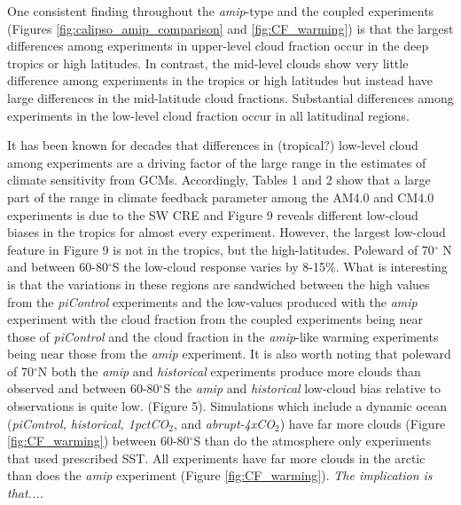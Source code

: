 \documentclass[draft]{agujournal2019}
\begin{document}
One consistent finding throughout the \textit{amip}-type and the coupled experiments (Figures \ref{fig:calipso_amip_comparison} 
and \ref{fig:CF_warming}) is that the largest differences among experiments
in upper-level cloud fraction occur in the deep tropics or high latitudes.  In contrast, the mid-level clouds show very little 
difference among experiments in the tropics or high latitudes but instead have large differences in the mid-latitude 
cloud fractions.  Substantial differences among experiments in the low-level cloud fraction occur in all latitudinal regions.    

It has been known for decades that differences in (tropical?) low-level cloud among experiments are a driving factor of the large range in the estimates of climate 
sensitivity from GCMs.  Accordingly, Tables 1 and 2 show that a large part of the range in climate feedback parameter among the AM4.0 and CM4.0 
experiments is due to the SW 
CRE and Figure 9 reveals different low-cloud biases in the tropics for almost every experiment.   
However, the largest low-cloud feature in Figure 9 is not in the tropics, but the high-latitudes.  Poleward of 70$^\circ$ N and between 
60-80$^\circ$S the low-cloud response varies by 8-15\%.  What is 
interesting is that the variations in these regions are sandwiched between the high values from the \textit{piControl} experiments and the low-values
produced with the \textit{amip} experiment with the cloud fraction from the coupled experiments being near those of \textit{piControl} and the
cloud fraction in the \textit{amip}-like warming experiments being near those from the \textit{amip} experiment.  
It is also worth noting that poleward of 70$^\circ$N both the \textit{amip} and \textit{historical} experiments produce more clouds than 
observed and between 60-80$^\circ$S the \textit{amip} and \textit{historical} low-cloud bias relative to observations is quite low. (Figure 5). 
Simulations which include a dynamic ocean (\textit{piControl, historical, 1pctCO$_2$}, and \textit{abrupt-4xCO$_2$}) have far more clouds (Figure \ref{fig:CF_warming})
between  60-80$^\circ$S than do the atmosphere only experiments that used prescribed
SST.  All experiments have far more clouds in the arctic than does the \textit{amip} experiment (Figure \ref{fig:CF_warming}).  
\textit{The implication is that....}
%
%
\end{document}
